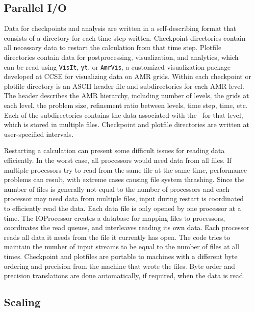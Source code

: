 \subsection{Parallel I/O}

Data for checkpoints and analysis are written in a self-describing format that consists 
of a directory for each time step written. Checkpoint directories contain all necessary 
data to restart the calculation from that time step. Plotfile directories contain data 
for postprocessing, visualization, and analytics, which can be read using {\tt VisIt}, {\tt yt}, or
{\tt AmrVis}, a customized visualization package developed at CCSE for visualizing 
data on AMR grids.  Within each checkpoint or plotfile directory is an ASCII header file and 
subdirectories for each AMR level.  The header describes the AMR hierarchy, including 
number of levels, the grids at each level, the problem size, refinement ratio 
between levels, time step, time, etc.  Each of the subdirectories contains the data 
associated with the \MultiFab\ for that level, which is stored in multiple files.
Checkpoint and plotfile directories are written at user-specified intervals. 

Restarting a calculation can present some difficult issues for reading data efficiently. 
In the worst case, all processors would need data from all files. If multiple processors 
try to read from the same file at the same time, performance problems can result, with 
extreme cases causing file system thrashing. Since the number of files is generally not 
equal to the number of processors and each processor may need data from multiple files, 
input during restart is coordinated to efficiently read the data. Each data file is only 
opened by one processor at a time. The IOProcessor creates a database for mapping files 
to processors, coordinates the read queues, and interleaves reading its own data. Each 
processor reads all data it needs from the file it currently has open. The code tries to 
maintain the number of input streams to be equal to the number of files at all times. 
Checkpoint and plotfiles are portable to machines with a different byte ordering and 
precision from the machine that wrote the files. Byte order and precision translations 
are done automatically, if required, when the data is read.

\subsection{Scaling}

